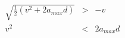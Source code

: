 \begin{eqnarray*}
\sqrt{\frac{1}{2} (v^2 + 2 a_{max} d)} & > & -v \\
v^2 & < & 2 a_{max} d
\end{eqnarray*}
